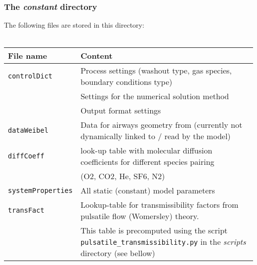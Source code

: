\subsubsection{The \textit{constant} directory}
The following files are stored in this directory:
\\ \\
\begin{tabular}{L{0.25\textwidth} L{0.75\textwidth}}
  \toprule
  File name      & Content \\
  \midrule
  \texttt{controlDict} & Process settings (washout type, gas species, boundary conditions type) \\
                       & Settings for the numerical solution method \\
                       & Output format settings \\
  \midrule
  \texttt{dataWeibel}  & Data for airways geometry from \citet{Weibel1963} (currently not dynamically linked to / read by the model) \\
  \midrule
  \texttt{diffCoeff}   & look-up table with molecular diffusion coefficients for different species pairing \\
                       & (O2, CO2, He, SF6, N2) \\
  \midrule
  \texttt{systemProperties} & All static (constant) model parameters \\
  \midrule
  \texttt{transFact}   & Lookup-table for transmissibility factors from pulsatile flow (Womersley) theory.\\
                       & This table is precomputed using the script \texttt{pulsatile\_transmissibility.py} in the \textit{scripts} directory (see bellow) \\
  \bottomrule
\end{tabular}

\clearpage

